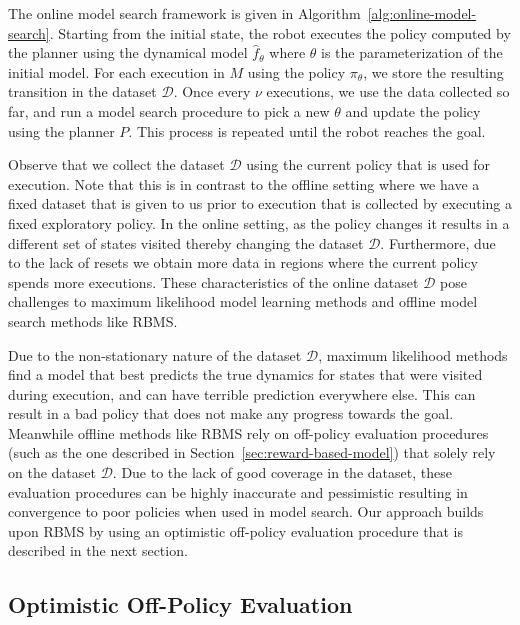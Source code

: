 The online model search framework is given in
Algorithm~\ref{alg:online-model-search}. Starting from the initial
state, the robot executes the policy computed by the planner using the
dynamical model $\hat{f}_\theta$ where $\theta$ is the
parameterization of the initial model. For each execution in $M$ using
the policy $\pi_\theta$, we store the resulting transition in the
dataset $\mathcal{D}$. Once every $\nu$ executions, we use the data
collected so far, and run a model search procedure to pick a new
$\theta$ and update the policy using the planner $P$. This process is
repeated until the robot reaches the goal.

Observe that we collect the dataset $\mathcal{D}$ using the current
policy that is used for execution. Note that this is in contrast to the 
offline setting where we have a fixed dataset that is given to us
prior to execution that is collected by executing a fixed exploratory
policy. In the online setting, as the policy changes it results in a
different set of states visited thereby changing the dataset
$\mathcal{D}$. Furthermore, due to the lack of resets we obtain more
data in regions where the current policy spends more executions. These
characteristics of the online dataset $\mathcal{D}$ pose challenges to
maximum likelihood model learning methods and offline model search
methods like RBMS.

Due to the non-stationary nature of the dataset $\mathcal{D}$, maximum
likelihood methods find a model that best predicts the true dynamics
for states that were visited during execution, and can have terrible
prediction everywhere else. This can result in a bad policy that does
not make any progress towards the goal. Meanwhile offline methods like
RBMS rely on off-policy evaluation procedures (such as the one
described in Section~\ref{sec:reward-based-model}) that solely rely on
the dataset $\mathcal{D}$. Due to the lack of good coverage in the
dataset, these evaluation procedures can be highly inaccurate and
pessimistic resulting in convergence to poor policies when used in
model search. Our approach \taml{} builds upon RBMS by using an
optimistic off-policy evaluation procedure that is described in the
next section.

\subsection{Optimistic Off-Policy Evaluation}
\label{sec:evaluation}

